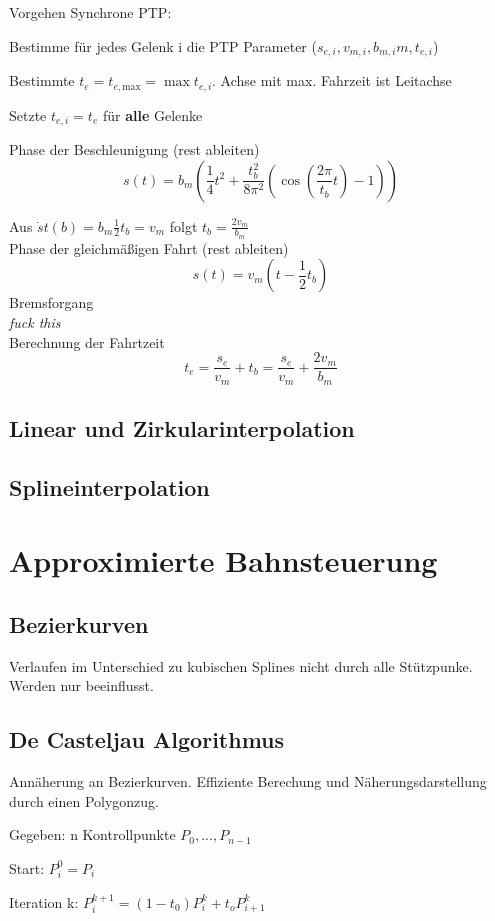 Vorgehen Synchrone PTP:\\
\begin{compactitem}
    \item Bestimme für jedes Gelenk i die PTP Parameter ($s_{e,i}, v_{m,i}, b_{m,i}m, t_{e,i}$)
    \item Bestimmte $t_e = t_{e,\text{max}} = \max{t_{e,i}}$. Achse mit max. Fahrzeit ist Leitachse
    \item Setzte $t_{e,i} = t_e$ für \textbf{alle} Gelenke
\end{compactitem}
Phase der Beschleunigung (rest ableiten)
\begin{displaymath}
     s(t) = b_m(\frac{1}{4}t^2 +\frac{t_b^2}{8\pi^2}(\cos(\frac{2\pi}{t_b}t)-1))
\end{displaymath}

Aus $\dot{s}t(b) = b_m\frac{1}{2}t_b = v_m$ folgt $t_b = \frac{2v_m}{b_m}$\\
Phase der gleichmäßigen Fahrt (rest ableiten)
\begin{displaymath}
     s(t) = v_m(t-\frac{1}{2}t_b)
\end{displaymath}
Bremsforgang\\
\textit{fuck this}\\


Berechnung der Fahrtzeit
\begin{displaymath}
     t_e = \frac{s_e}{v_m} + t_b = \frac{s_e}{v_m}+ \frac{2v_m}{b_m}
\end{displaymath}
\subsection{Linear und Zirkularinterpolation}

\subsection{Splineinterpolation}
\section{Approximierte Bahnsteuerung}
\subsection{Bezierkurven}
Verlaufen im Unterschied zu kubischen Splines nicht durch alle Stützpunke. Werden nur beeinflusst.
\subsection{De Casteljau Algorithmus}
Annäherung an Bezierkurven. Effiziente Berechung und Näherungsdarstellung durch einen
Polygonzug.

\begin{compactitem}
    \item Gegeben: n Kontrollpunkte $P_0, ..., P_{n-1}$
    \item Start: $P_i^0 = P_i$
    \item Iteration k: $P_i^{k+1} = (1-t_0)P_i^k + t_oP_{i+1}^k$
\end{compactitem}
